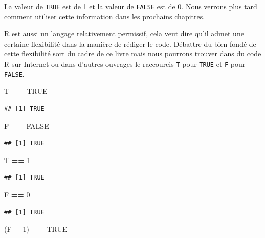 \documentclass[]{book}
\newenvironment{Shaded}{\begin{snugshade}}{\end{snugshade}}
\newcommand{\DecValTok}[1]{\textcolor[rgb]{0.00,0.00,0.81}{#1}}
\newcommand{\NormalTok}[1]{#1}
\newcommand{\OperatorTok}[1]{\textcolor[rgb]{0.81,0.36,0.00}{\textbf{#1}}}
\newcommand{\OtherTok}[1]{\textcolor[rgb]{0.56,0.35,0.01}{#1}}
\newcommand{\StringTok}[1]{\textcolor[rgb]{0.31,0.60,0.02}{#1}}
\begin{document}
La valeur de \texttt{TRUE} est de 1 et la valeur de \texttt{FALSE} est de 0. Nous verrons plus tard comment utiliser cette information dans les prochains chapitres.

R est aussi un langage relativement permissif, cela veut dire qu'il admet une certaine flexibilité dans la manière de rédiger le code. Débattre du bien fondé de cette flexibilité sort du cadre de ce livre mais nous pourrons trouver dans du code R sur Internet ou dans d'autres ouvrages le raccourcis \texttt{T} pour \texttt{TRUE} et \texttt{F} pour \texttt{FALSE}.

\begin{Shaded}
\begin{Highlighting}[]
\NormalTok{T }\OperatorTok{==}\StringTok{ }\OtherTok{TRUE}
\end{Highlighting}
\end{Shaded}

\begin{verbatim}
## [1] TRUE
\end{verbatim}

\begin{Shaded}
\begin{Highlighting}[]
\NormalTok{F }\OperatorTok{==}\StringTok{ }\OtherTok{FALSE}
\end{Highlighting}
\end{Shaded}

\begin{verbatim}
## [1] TRUE
\end{verbatim}

\begin{Shaded}
\begin{Highlighting}[]
\NormalTok{T }\OperatorTok{==}\StringTok{ }\DecValTok{1}
\end{Highlighting}
\end{Shaded}

\begin{verbatim}
## [1] TRUE
\end{verbatim}

\begin{Shaded}
\begin{Highlighting}[]
\NormalTok{F }\OperatorTok{==}\StringTok{ }\DecValTok{0}
\end{Highlighting}
\end{Shaded}

\begin{verbatim}
## [1] TRUE
\end{verbatim}

\begin{Shaded}
\begin{Highlighting}[]
\NormalTok{(F }\OperatorTok{+}\StringTok{ }\DecValTok{1}\NormalTok{) }\OperatorTok{==}\StringTok{ }\OtherTok{TRUE}
\end{Highlighting}
\end{Shaded}
\end{document}
